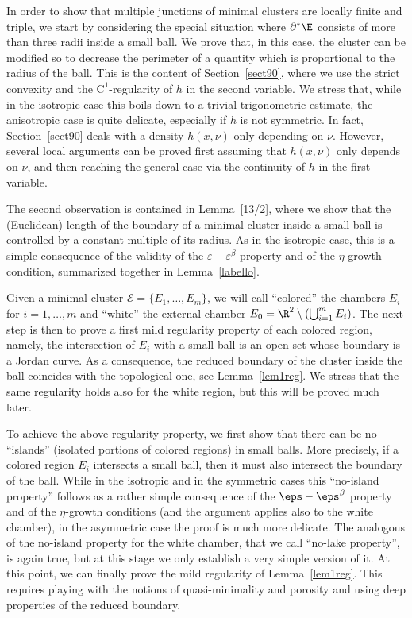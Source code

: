 In order to show that multiple junctions of minimal clusters are locally finite and triple, we start by considering the special situation where $\partial^*\E$ consists of more than three radii inside a small ball. We prove that, in this case, the cluster can be modified so to decrease the perimeter of a quantity which is proportional to the radius of the ball. This is the content of Section~\ref{sect90}, where we use the strict convexity and the $\mathrm{C}^1$-regularity of $h$ in the second variable. We stress that, while in the isotropic case this boils down to a trivial trigonometric estimate, the anisotropic case is quite delicate, especially if $h$ is not symmetric. In fact, Section~\ref{sect90} deals with a density $h(x,\nu)$ only depending on $\nu$. However, several local arguments can be proved first assuming that $h(x,\nu)$ only depends on $\nu$, and then reaching the general case via the continuity of $h$ in the first variable.

The second observation is contained in Lemma~\ref{13/2}, where we show that the (Euclidean) length of the boundary of a minimal cluster inside a small ball is controlled by a constant multiple of its radius. As in the isotropic case, this is a simple consequence of the validity of the $\varepsilon-\varepsilon^\beta$ property and of the $\eta$-growth condition, summarized together in Lemma~\ref{labello}.

Given a minimal cluster $\mathcal E=\{E_1,\dots,E_m\}$, we will call ``colored'' the chambers $E_i$ for $i=1,\dots, m$ and ``white'' the external chamber $E_0=\R^2\setminus (\bigcup_{i=1}^mE_i)$. The next step is then to prove a first mild regularity property of each colored region, namely, the intersection of $E_i$ with a small ball is an open set whose boundary is a Jordan curve. As a consequence, the reduced boundary of the cluster inside the ball coincides with the topological one, see Lemma~\ref{lem1reg}. We stress that the same regularity holds also for the white region, but this will be proved much later.\enlargethispage{.5\baselineskip}%

To achieve the above regularity property, we first show that there can be no ``islands'' (\ie isolated portions of colored regions) in small balls. More precisely, if a colored region $E_i$ intersects a small ball, then it must also intersect the boundary of the ball. While in the isotropic and in the symmetric cases this ``no-island property'' follows as a rather simple consequence of the $\eps-\eps^\beta$ property and of the $\eta$-growth conditions (and the argument applies also to the white chamber), in the asymmetric case the proof is much more delicate. The analogous of the no-island property for the white chamber, that we call ``no-lake property'', is again true, but at this stage we only establish a very simple version of it. At this point, we can finally prove the mild regularity of Lemma~\ref{lem1reg}. This requires playing with the notions of quasi-minimality and porosity and using deep properties of the reduced boundary.

